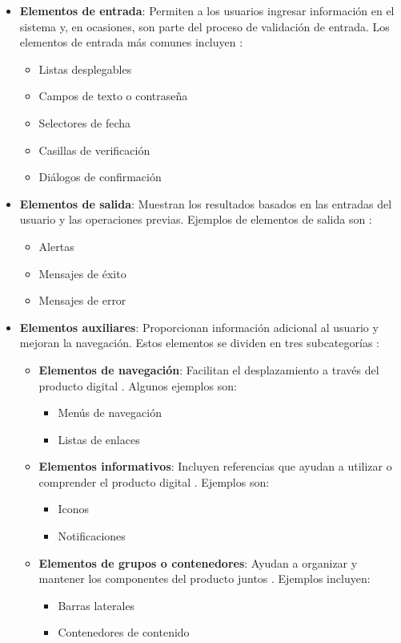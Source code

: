 \begin{itemize}
    \item \textbf{Elementos de entrada}: Permiten a los usuarios ingresar información en el sistema y, en ocasiones, son parte del proceso de validación de entrada. Los elementos de entrada más comunes incluyen \cite{OrtegaSF}:
    \begin{itemize}
        \item Listas desplegables
        \item Campos de texto o contraseña
        \item Selectores de fecha
        \item Casillas de verificación
        \item Diálogos de confirmación
    \end{itemize}
    \item \textbf{Elementos de salida}: Muestran los resultados basados en las entradas del usuario y las operaciones previas. Ejemplos de elementos de salida son \cite{OrtegaSF}:
    \begin{itemize}
        \item Alertas
        \item Mensajes de éxito
        \item Mensajes de error
    \end{itemize}
    \item \textbf{Elementos auxiliares}: Proporcionan información adicional al usuario y mejoran la navegación. Estos elementos se dividen en tres subcategorías \cite{OrtegaSF}:
    \begin{itemize}
        \item \textbf{Elementos de navegación}: Facilitan el desplazamiento a través del producto digital \cite{OrtegaSF}. Algunos ejemplos son:
        \begin{itemize}
            \item Menús de navegación
            \item Listas de enlaces
        \end{itemize}
        \item \textbf{Elementos informativos}: Incluyen referencias que ayudan a utilizar o comprender el producto digital \cite{OrtegaSF}. Ejemplos son:
        \begin{itemize}
            \item Iconos
            \item Notificaciones
        \end{itemize}
        \item \textbf{Elementos de grupos o contenedores}: Ayudan a organizar y mantener los componentes del producto juntos \cite{OrtegaSF}. Ejemplos incluyen:
        \begin{itemize}
            \item Barras laterales
            \item Contenedores de contenido
        \end{itemize}
    \end{itemize}
\end{itemize}

